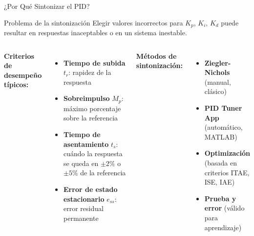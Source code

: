 \documentclass[aspectratio=169,xcolor=dvipsnames]{beamer}
\begin{document}
\begin{frame}{¿Por Qué Sintonizar el PID?}
    \footnotesize
    \begin{alertblock}{Problema de la sintonización}
        Elegir valores incorrectos para $K_p$, $K_i$, $K_d$ puede resultar en respuestas inaceptables o en un sistema inestable.
    \end{alertblock}
    \vspace{0.4em}
    \begin{columns}
        \textbf{Criterios de desempeño típicos:}
        \begin{itemize}
            \item \textbf{Tiempo de subida} $t_r$: rapidez de la respuesta
            \item \textbf{Sobreimpulso} $M_p$: máximo porcentaje sobre la referencia
            \item \textbf{Tiempo de asentamiento} $t_s$: cuándo la respuesta se queda en $\pm 2\%$ o $\pm 5\%$ de la referencia
            \item \textbf{Error de estado estacionario} $e_{ss}$: error residual permanente
        \end{itemize}
        \textbf{Métodos de sintonización:}
        \begin{itemize}
            \item \textbf{Ziegler-Nichols} (manual, clásico)
            \item \textbf{PID Tuner App} (automático, MATLAB)
            \item \textbf{Optimización} (basada en criterios ITAE, ISE, IAE)
            \item \textbf{Prueba y error} (válido para aprendizaje)
        \end{itemize}
    \end{columns}
\end{frame}
\end{document}
